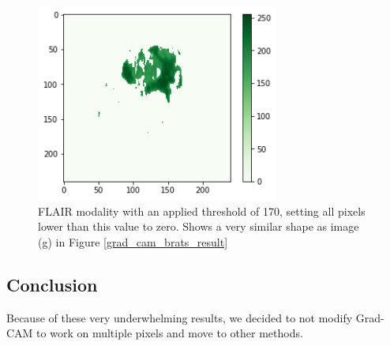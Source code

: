 \begin{figure}[H]
\centering
\includegraphics[width=8cm]{chapters/04_segmentation/images/flair_treshold.png}
\captionsetup{width=12cm}
\caption{FLAIR modality with an applied threshold of 170, setting all pixels lower than this value to zero. Shows a very similar shape as image (g) in Figure \ref{grad_cam_brats_result}}
\label{grad_cam_treshold}
\end{figure}


\subsection{Conclusion}
Because of these very underwhelming results, we decided to not modify Grad-CAM to work on multiple pixels and move to other methods.
